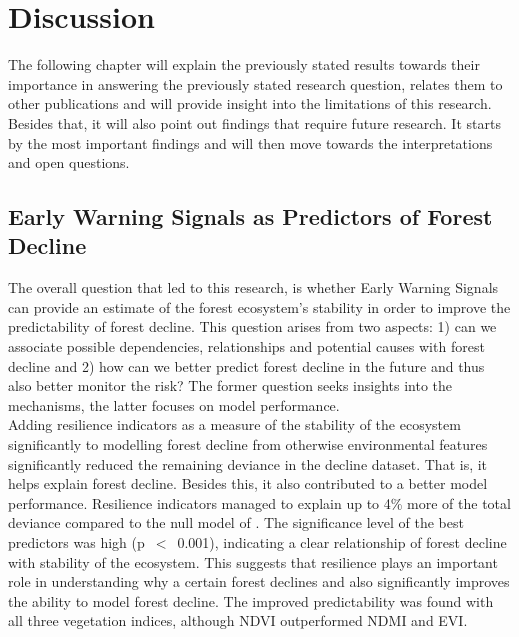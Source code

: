 \section{Discussion}\label{discussion}
The following chapter will explain the previously stated results towards their importance in answering the previously stated research question, relates them to other publications and will provide insight into the limitations of this research. Besides that, it will also point out findings that require future research. It starts by the most important findings and will then move towards the interpretations and open questions.\\

\subsection{Early Warning Signals as Predictors of Forest Decline}\label{disc:pred}
The overall question that led to this research, is whether Early Warning Signals can provide an estimate of the forest ecosystem's stability in order to improve the predictability of forest decline. This question arises from two aspects: 1) can we associate possible dependencies, relationships and potential causes with forest decline and 2) how can we better predict forest decline in the future and thus also better monitor the risk? The former question seeks insights into the mechanisms, the latter focuses on model performance.\\
Adding resilience indicators as a measure of the stability of the ecosystem significantly to modelling forest decline from otherwise environmental features significantly reduced the remaining deviance in the decline dataset. That is, it helps explain forest decline. Besides this, it also contributed to a better model performance. Resilience indicators managed to explain up to 4\% more of the total deviance compared to the null model of \cite{chaparro2017}. The significance level of the best predictors was high (p~$<$~0.001), indicating a clear relationship of forest decline with stability of the ecosystem. This suggests that resilience plays an important role in understanding why a certain forest declines and also significantly improves the ability to model forest decline. The improved predictability was found with all three vegetation indices, although NDVI outperformed NDMI and EVI.\\
